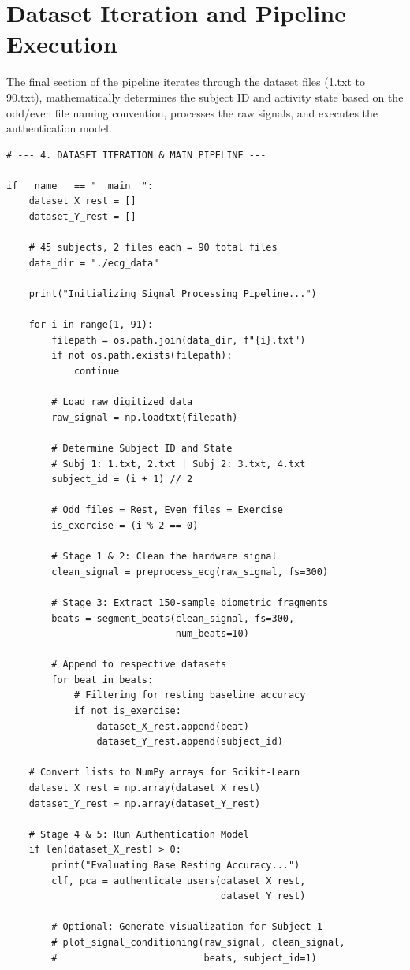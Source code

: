 \documentclass[12pt,a4paper]{report}
\begin{document}
\section{Dataset Iteration and Pipeline Execution}
The final section of the pipeline iterates through the dataset files (1.txt to 90.txt), mathematically determines the subject ID and activity state based on the odd/even file naming convention, processes the raw signals, and executes the authentication model.

\begin{verbatim}
# --- 4. DATASET ITERATION & MAIN PIPELINE ---

if __name__ == "__main__":
    dataset_X_rest = []
    dataset_Y_rest = []
    
    # 45 subjects, 2 files each = 90 total files
    data_dir = "./ecg_data" 
    
    print("Initializing Signal Processing Pipeline...")
    
    for i in range(1, 91):
        filepath = os.path.join(data_dir, f"{i}.txt")
        if not os.path.exists(filepath):
            continue
            
        # Load raw digitized data
        raw_signal = np.loadtxt(filepath)
        
        # Determine Subject ID and State
        # Subj 1: 1.txt, 2.txt | Subj 2: 3.txt, 4.txt
        subject_id = (i + 1) // 2
        
        # Odd files = Rest, Even files = Exercise
        is_exercise = (i % 2 == 0) 
        
        # Stage 1 & 2: Clean the hardware signal
        clean_signal = preprocess_ecg(raw_signal, fs=300)
        
        # Stage 3: Extract 150-sample biometric fragments
        beats = segment_beats(clean_signal, fs=300, 
                              num_beats=10)
        
        # Append to respective datasets
        for beat in beats:
            # Filtering for resting baseline accuracy
            if not is_exercise:
                dataset_X_rest.append(beat)
                dataset_Y_rest.append(subject_id)
                
    # Convert lists to NumPy arrays for Scikit-Learn
    dataset_X_rest = np.array(dataset_X_rest)
    dataset_Y_rest = np.array(dataset_Y_rest)
    
    # Stage 4 & 5: Run Authentication Model
    if len(dataset_X_rest) > 0:
        print("Evaluating Base Resting Accuracy...")
        clf, pca = authenticate_users(dataset_X_rest, 
                                      dataset_Y_rest)
        
        # Optional: Generate visualization for Subject 1
        # plot_signal_conditioning(raw_signal, clean_signal, 
        #                          beats, subject_id=1)
\end{verbatim}
\end{document}
